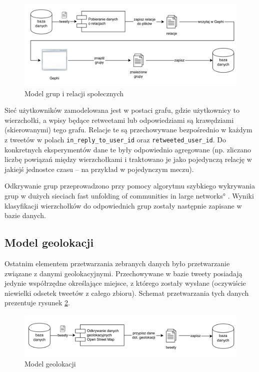 \begin{figure}[ht!]
\centering
\includegraphics[width=160mm]{img/odkrywanie-relacji.png}
\caption{Model grup i relacji społecznych}
\label{image:odkrywanie-relacji}
\end{figure}


Sieć użytkowników zamodelowana jest w postaci grafu, gdzie użytkownicy to
wierzchołki, a wpisy będące retweetami lub odpowiedziami są krawędziami
(skierowanymi) tego grafu. Relacje te są przechowywane bezpośrednio w każdym z
tweetów w polach \texttt{in\_reply\_to\_user\_id} oraz
\texttt{retweeted\_user\_id}.
Do konkretnych eksperymentów dane te były odpowiednio agregowane (np. zliczano
liczbę powiązań między wierzchołkami i traktowano je jako pojedynczą relację w
jakiejś jednostce czasu -- na przykład w pojedynczym meczu).

Odkrywanie grup przeprowadzono przy pomocy algorytmu szybkiego wykrywania grup w
dużych sieciach \ang{fast unfolding of communities in large networks}
. Wyniki klasyfikacji wierzchołków do
odpowiednich grup zostały następnie zapisane w bazie danych.


\subsection{Model geolokacji}
\label{subsection:modelgeolokacji}
Ostatnim elementem przetwarzania zebranych danych było przetwarzanie związane z
danymi geolokacyjnymi. Przechowywane w bazie tweety posiadają jedynie współrzędne
określające miejsce, z którego zostały wysłane (oczywiście niewielki odsetek
tweetów z całego zbioru). Schemat przetwarzania tych danych prezentuje rysunek
\ref{image:odkrywanie-geolokacji}.

\begin{figure}[ht!]
\centering
\includegraphics[width=160mm]{img/odkrywanie-geolokacji.png}
\caption{Model geolokacji}
\label{image:odkrywanie-geolokacji}
\end{figure}

